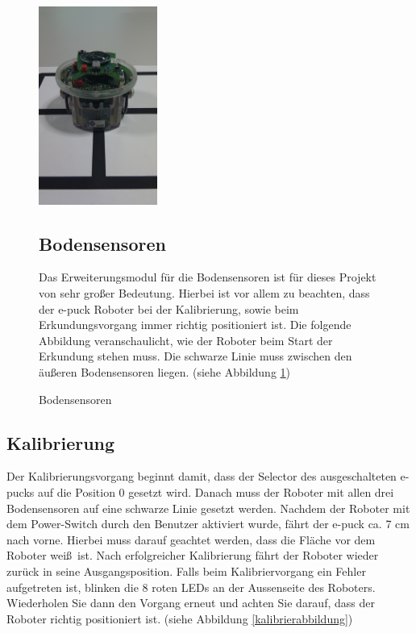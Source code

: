 \documentclass[10pt,a4paper]{article}
\begin{document}
    \begin{figure}[htbp]
		\begin{minipage}[t]{6.5cm}
			\vspace{0pt}
			\includegraphics[height=6.5cm]{images/puck2.png} 
			\caption{Bodensensoren}
			\label{positionierung_epuck}
		\end{minipage}
		\hfill
		\begin{minipage}[t]{0.5\textwidth}
			\vspace{10pt}
				\subsection{Bodensensoren}
						Das Erweiterungsmodul f\"ur die Bodensensoren ist f\"ur dieses Projekt von sehr gro\ss er Bedeutung. Hierbei ist vor allem zu beachten, dass der e-puck 								Roboter	bei der Kalibrierung, sowie beim Erkundungsvorgang immer richtig positioniert ist. Die folgende Abbildung veranschaulicht, wie der Roboter 
						beim Start der Erkundung	stehen muss. Die schwarze Linie muss zwischen den \"au\ss eren Bodensensoren liegen. (siehe Abbildung 				
						\ref{positionierung_epuck})
		\end{minipage}
   \end{figure}
   
\newpage

	\subsection{Kalibrierung}
		Der Kalibrierungsvorgang beginnt damit, dass der Selector des ausgeschalteten e-pucks auf die Position 0 gesetzt wird. Danach muss der Roboter mit allen drei
		Bodensensoren auf eine schwarze Linie gesetzt werden. Nachdem der Roboter mit dem Power-Switch durch den Benutzer aktiviert wurde, f\"ahrt der e-puck ca.
		7 cm nach vorne. Hierbei muss darauf geachtet werden, dass die Fl\"ache vor dem Roboter wei\ss \ ist. Nach erfolgreicher Kalibrierung f\"ahrt der Roboter wieder
		zur\"uck in seine Ausgangsposition. Falls beim Kalibriervorgang ein Fehler aufgetreten ist, blinken die 8 roten LEDs an der Aussenseite des Roboters. 
		Wiederholen Sie dann den Vorgang erneut und achten Sie darauf, dass der Roboter richtig positioniert ist. (siehe Abbildung \ref{kalibrierabbildung}) \\
		
\end{document}
